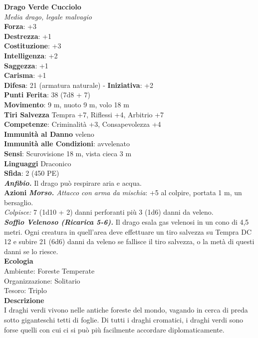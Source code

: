 \begin{multicols}{2}
\medskip\textbf{Drago Verde Cucciolo}\\
\emph{Media drago, legale malvagio}\\
\textbf{Forza}: +3\\
\textbf{Destrezza}: +1\\
\textbf{Costituzione}: +3\\
\textbf{Intelligenza}: +2\\
\textbf{Saggezza}: +1\\
\textbf{Carisma}: +1\\
\textbf{Difesa}: 21 (armatura naturale) - \textbf{Iniziativa}: +2\\
\textbf{Punti Ferita}: 38 (7d8 + 7)\\
\textbf{Movimento}: 9 m, nuoto 9 m, volo 18 m\\
\textbf{Tiri Salvezza} Tempra +7, Riflessi +4, Arbitrio +7\\
\textbf{Competenze}: Criminalità +3, Consapevolezza +4\\
\textbf{Immunità al Danno} veleno \\
\textbf{Immunità alle Condizioni}: avvelenato\\
\textbf{Sensi}: Scurovisione 18 m, vista cieca 3 m \\
\textbf{Linguaggi} Draconico\\
\textbf{Sfida}: 2 (450 PE)\smallskip\\
\emph{\textbf{Anfibio.}} Il drago può respirare aria e acqua.\\
\smallskip\textbf{Azioni}
\emph{\textbf{Morso.} Attacco con arma da mischia}: +5 al colpire, portata 1 m, un bersaglio.\\
\emph{Colpisce:} 7 (1d10 + 2) danni perforanti più 3 (1d6) danni da veleno.\\
\emph{\textbf{Soffio Velenoso (Ricarica 5-6).}} Il drago esala gas velenosi in un cono di 4,5 metri. Ogni creatura in quell'area deve effettuare un tiro salvezza su Tempra DC  12 e subire 21 (6d6) danni da veleno se fallisce il tiro salvezza, o la metà di questi danni se lo riesce.\\
\textbf{Ecologia}\\
Ambiente: Foreste Temperate\\
Organizzazione: Solitario\\
Tesoro: Triplo\\
\textbf{Descrizione}\\
I draghi verdi vivono nelle antiche foreste del mondo, vagando in cerca di preda sotto giganteschi tetti di foglie. Di tutti i draghi cromatici, i draghi verdi sono forse quelli con cui ci si può più facilmente accordare diplomaticamente.\\


\end{multicols}
